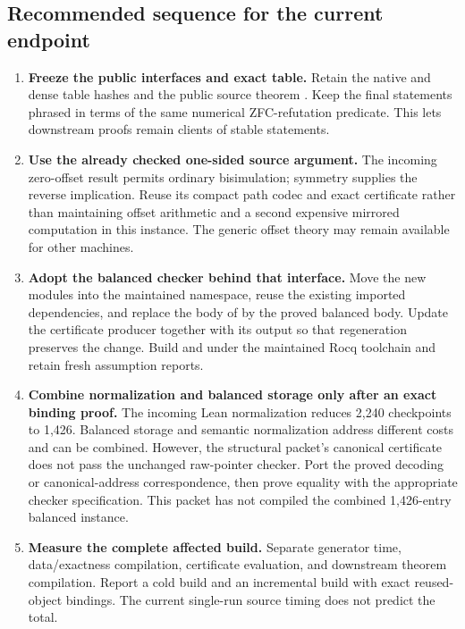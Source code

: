 \subsection{Recommended sequence for the current endpoint}

\begin{enumerate}
\item \textbf{Freeze the public interfaces and exact table.}
Retain the native and dense table hashes and the public source theorem
. Keep the final statements phrased in terms of the
same numerical ZFC-refutation predicate. This lets downstream proofs
remain clients of stable statements.

\item \textbf{Use the already checked one-sided source argument.}
The incoming zero-offset result permits ordinary bisimulation; symmetry
supplies the reverse implication. Reuse its compact path codec and exact
certificate rather than maintaining offset arithmetic and a second
expensive mirrored computation in this instance. The generic offset
theory may remain available for other machines.

\item \textbf{Adopt the balanced checker behind that interface.}
Move the new modules into the maintained namespace, reuse the existing
imported dependencies, and replace the body of  by
the proved balanced body. Update the certificate producer together with
its output so that regeneration preserves the change. Build
 and  under the maintained Rocq
toolchain and retain fresh assumption reports.

\item \textbf{Combine normalization and balanced storage only after an
exact binding proof.}
The incoming Lean normalization reduces 2,240 checkpoints to 1,426.
Balanced storage and semantic normalization address different costs and
can be combined. However, the structural packet's canonical certificate
does not pass the unchanged raw-pointer checker. Port the proved decoding
or canonical-address correspondence, then prove equality with the
appropriate checker specification. This packet has not compiled the
combined 1,426-entry balanced instance.

\item \textbf{Measure the complete affected build.}
Separate generator time, data/exactness compilation, certificate
evaluation, and downstream theorem compilation. Report a cold build and
an incremental build with exact reused-object bindings. The current
single-run source timing does not predict the total.
\end{enumerate}

